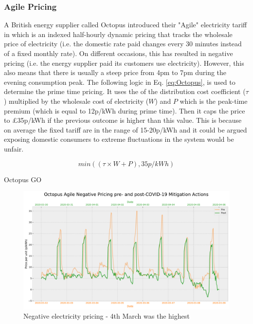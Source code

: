 \documentclass[energies,article,submit,moreauthors,pdftex]{Definitions/mdpi}
\begin{document}
\subsubsection{Agile Pricing}
A British energy supplier called Octopus \cite{AgileEnergy} introduced their "Agile" electricity tariff in which is an indexed half-hourly dynamic pricing that tracks the wholesale price of electricity (i.e. the domestic rate paid changes every 30 minutes instead of a fixed monthly rate). On different occasions, this has resulted in negative pricing (i.e. the energy supplier paid its customers use electricity). However, this also means that there is usually a steep price from 4pm to 7pm during the evening consumption peak. The following logic in Eq. \ref{eq:Octopus}, is used to determine the prime time pricing. It uses the of the distribution cost coefficient ($\tau$) multiplied by the wholesale cost of electricity ($W$) and $P$ which is the peak-time premium (which is equal to 12p/kWh during prime time). Then it caps the price to £35p/kWh if the previous outcome is higher than this value. This is because on average the fixed tariff are in the range of 15-20p/kWh and it could be argued exposing domestic consumers to extreme fluctuations in the system would be unfair.

\begin{equation}\label{eq:Octopus}
min((\tau \times W + P), 35p/kWh)
\end{equation}

Octopus GO


\begin{figure}[H]\centering
\hspace{-25pt}\includegraphics[width=15 cm]{Graphics/Pre-post_Agilecomp_negative.pdf}
\caption{Negative electricity pricing - 4th March was the highest }\label{fig:neg_agile_comp_prepost}
\end{figure}  
\end{document}
